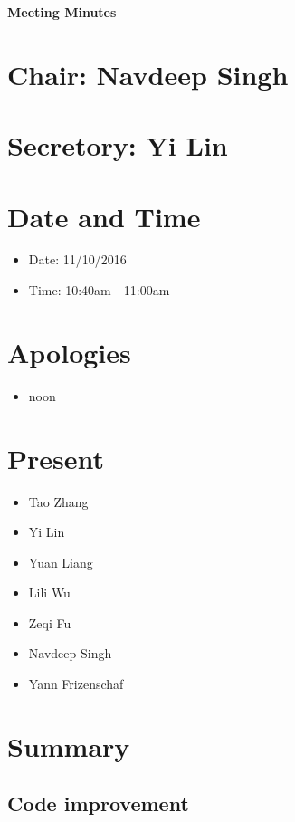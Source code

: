 \documentclass[11pt, a4paper]{article}
\begin{document}
\vspace*{15pt}
\begin{center}
\huge \bf Meeting Minutes
\end{center}

\section*{Chair: Navdeep Singh}
\section*{Secretory: Yi Lin}
\vspace*{10pt}

\section{Date and Time}
\begin{itemize}
\item Date: 11/10/2016
\item Time: 10:40am - 11:00am
\end{itemize}

\section{Apologies}
\begin{itemize}
\item noon
\end{itemize}

\section{Present}
\begin{itemize}
\item Tao Zhang
\item Yi Lin
\item Yuan Liang
\item Lili Wu
\item Zeqi Fu
\item Navdeep Singh
\item Yann Frizenschaf
\end{itemize}



\section{Summary }
\subsection{Code improvement}
\end{document}
